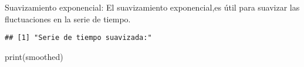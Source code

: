 \documentclass[
]{book}
\newenvironment{Shaded}{\begin{snugshade}}{\end{snugshade}}
\newcommand{\AttributeTok}[1]{\textcolor[rgb]{0.77,0.63,0.00}{#1}}
\newcommand{\CommentTok}[1]{\textcolor[rgb]{0.56,0.35,0.01}{\textit{#1}}}
\newcommand{\ConstantTok}[1]{\textcolor[rgb]{0.00,0.00,0.00}{#1}}
\newcommand{\FunctionTok}[1]{\textcolor[rgb]{0.00,0.00,0.00}{#1}}
\newcommand{\NormalTok}[1]{#1}
\newcommand{\OtherTok}[1]{\textcolor[rgb]{0.56,0.35,0.01}{#1}}
\newcommand{\SpecialCharTok}[1]{\textcolor[rgb]{0.00,0.00,0.00}{#1}}
\newcommand{\StringTok}[1]{\textcolor[rgb]{0.31,0.60,0.02}{#1}}
\begin{document}
Suavizamiento exponencial:
El suavizamiento exponencial,es útil para suavizar las fluctuaciones en la serie de tiempo.

\begin{Shaded}
\end{Shaded}

\begin{verbatim}
## [1] "Serie de tiempo suavizada:"
\end{verbatim}

\begin{Shaded}
\begin{Highlighting}[]
\FunctionTok{print}\NormalTok{(smoothed)}
\end{Highlighting}
\end{Shaded}
\end{document}
